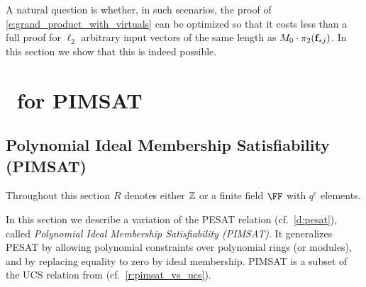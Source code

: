 \documentclass[11pt,letterpaper,usenames,dvipsnames]{article}
\begin{document}
A natural question is whether, in such scenarios, the proof of \eqref{e:grand_product_with_virtuals} can be optimized so that it costs less than a full proof for $\ell_2$ arbitrary input vectors of the same length as $M_0\cdot \pi_2(\mathbf{f}_{*j})$. In this section we show that this is indeed possible.









\section{\ftwoz \  for PIMSAT}


\subsection{Polynomial Ideal Membership Satisfiability (PIMSAT)}


Throughout this section $R$ denotes either $\mathbb{Z}$ or a finite field $\FF$ with $q^e$ elements. 

In this section we describe a variation of the PESAT  relation (cf.\ \cref{d:pesat}), called \emph{Polynomial Ideal Membership Satisfiability (PIMSAT)}. It generalizes PESAT by allowing polynomial constraints over polynomial rings (or modules), and by replacing equality to zero by ideal membership. PIMSAT is a subset of the UCS relation from \cite{zincplus} (cf.\ \cref{r:pimsat_vs_ucs}). %



 
\end{document}

